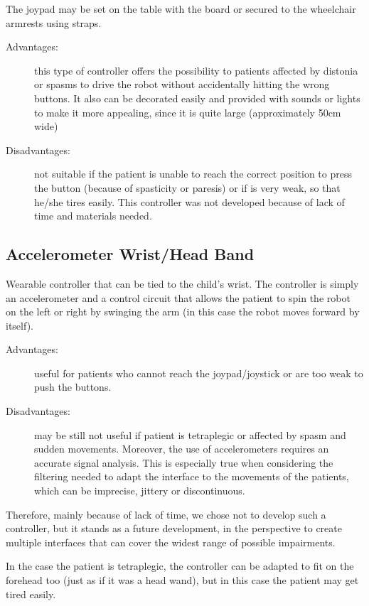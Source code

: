 \documentclass[a4paper,twoside]{book}
\begin{document}
\beforelist* The joypad may be set on the table with the board or secured to the wheelchair armrests using straps.
\begin{description}
\item[Advantages:] this type of controller offers the possibility to patients affected by distonia or spasms to drive the robot without accidentally hitting the wrong buttons. It also can be decorated easily and provided with sounds or lights to make it more appealing, since it is quite large (approximately 50cm wide)
\item[Disadvantages:] not suitable if the patient is unable to reach the correct position to press the button (because of spasticity or paresis) or if is very weak, so that he/she tires easily.
This controller was not developed because of lack of time and materials needed.
\end{description}
\afterlist*

\subsection{Accelerometer Wrist/Head Band}
\label{ssec:accel}
\beforelist* Wearable controller that can be tied to the child's wrist. The controller is simply an accelerometer and a control circuit that allows the patient to spin the robot on the left or right by swinging the arm (in this case the robot moves forward by itself).
\begin{description}
\item[Advantages:] useful for patients who cannot reach the joypad/joystick or are too weak to push the buttons.
\item[Disadvantages:] may be still not useful if patient is tetraplegic or affected by spasm and sudden movements. Moreover, the use of accelerometers requires an accurate signal analysis. This is especially true when considering the filtering needed to adapt the interface to the movements of the patients, which can be imprecise, jittery or discontinuous. 
\end{description}
\afterlist*

Therefore, mainly because of lack of time, we chose not to develop such a controller, but it stands as a future development, in the perspective to create multiple interfaces that can cover the widest range of possible impairments.

In the case the patient is tetraplegic, the controller can be adapted to fit on the forehead too (just as if it was a head wand), but in this case the patient may get tired easily.
\end{document}

